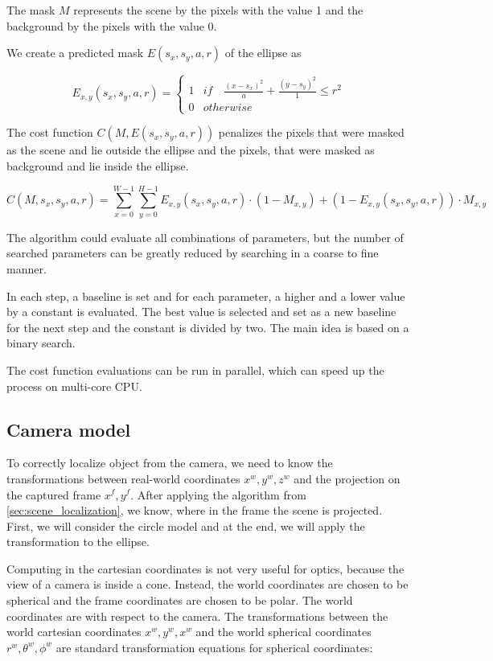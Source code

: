 \documentclass[a4paper,11pt,titlepage,twoside]{article}
\numberwithin{figure}{section}
\begin{document}
The mask $M$ represents the scene by the pixels with the value 1 and the background by the pixels with the value 0. 

We create a predicted mask $E(s_x, s_y, a, r)$ of the ellipse as 

\begin{equation}
E_{x,y}(s_x, s_y, a, r) = \begin{cases}
1 & if \quad \frac{(x-s_x)^2}{a} + \frac{(y-s_y)^2}{1} \leq r^2 \\
0 & otherwise
\end{cases}
\end{equation}

The cost function $C(M, E(s_x, s_y, a, r))$ penalizes the pixels that were masked as the scene and lie outside the ellipse and the pixels, that were masked as background and lie inside the ellipse.

\begin{equation}
C(M, s_x, s_y, a, r) = \sum_{x = 0}^{W-1} \sum_{y = 0}^{H-1} E_{x,y}(s_x, s_y, a, r) \cdot (1-M_{x,y}) + (1 - E_{x,y}(s_x, s_y, a, r)) \cdot M_{x,y}
\end{equation}

The algorithm could evaluate all combinations of parameters, but the number of searched parameters can be greatly reduced by searching in a coarse to fine manner. 

In each step, a baseline is set and for each parameter, a higher and a lower value by a constant is evaluated. The best value is selected and set as a new baseline for the next step and the constant is divided by two. The main idea is based on a binary search.

The cost function evaluations can be run in parallel, which can speed up the process on multi-core CPU.

\subsection{Camera model}

To correctly localize object from the camera, we need to know the transformations between real-world coordinates $x^w, y^w, z^w$ and the projection on the captured frame $x^f, y^f$. After applying the algorithm from \ref{sec:scene_localization}, we know, where in the frame the scene is projected. First, we will consider the circle model and at the end, we will apply the transformation to the ellipse. 

Computing in the cartesian coordinates is not very useful for optics, because the view of a camera is inside a cone. Instead, the world coordinates are chosen to be spherical and the frame coordinates are chosen to be polar. The world coordinates are with respect to the camera. The transformations between the world cartesian coordinates $x^w, y^w, x^w$ and the world spherical coordinates $r^w, \theta^w, \phi^w$ are standard transformation equations for spherical coordinates:
\end{document}
